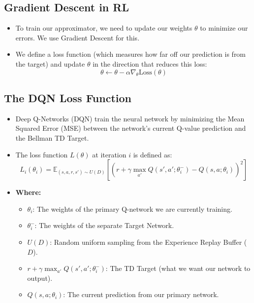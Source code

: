 \documentclass[12pt]{article}
\begin{document}
\subsection*{Gradient Descent in RL}
\begin{itemize}[label=$\bullet$]
    \item To train our approximator, we need to update our weights $\theta$ to minimize our errors. We use Gradient Descent for this. 
    \item We define a loss function (which measures how far off our prediction is from the target) and update $\theta$ in the direction that reduces this loss:
    $$\theta \leftarrow \theta - \alpha \nabla_\theta \text{Loss}(\theta)$$
\end{itemize}

\subsection*{The DQN Loss Function}
\begin{itemize}[label=$\bullet$]
    \item Deep Q-Networks (DQN) train the neural network by minimizing the Mean Squared Error (MSE) between the network's current Q-value prediction and the Bellman TD Target.
    \item The loss function $L(\theta)$ at iteration $i$ is defined as:
    $$L_i(\theta_i) = \mathbb{E}_{(s, a, r, s') \sim U(D)} \left[ \left( r + \gamma \max_{a'} Q(s', a'; \theta_i^-) - Q(s, a; \theta_i) \right)^2 \right]$$
    \item \textbf{Where:}
    \begin{itemize}[label=$\circ$]
        \item $\theta_i$: The weights of the primary Q-network we are currently training.
        \item $\theta_i^-$: The weights of the separate Target Network.
        \item $U(D)$: Random uniform sampling from the Experience Replay Buffer ($D$).
        \item $r + \gamma \max_{a'} Q(s', a'; \theta_i^-)$: The TD Target (what we want our network to output).
        \item $Q(s, a; \theta_i)$: The current prediction from our primary network.
    \end{itemize}
\end{itemize}
\end{document}
